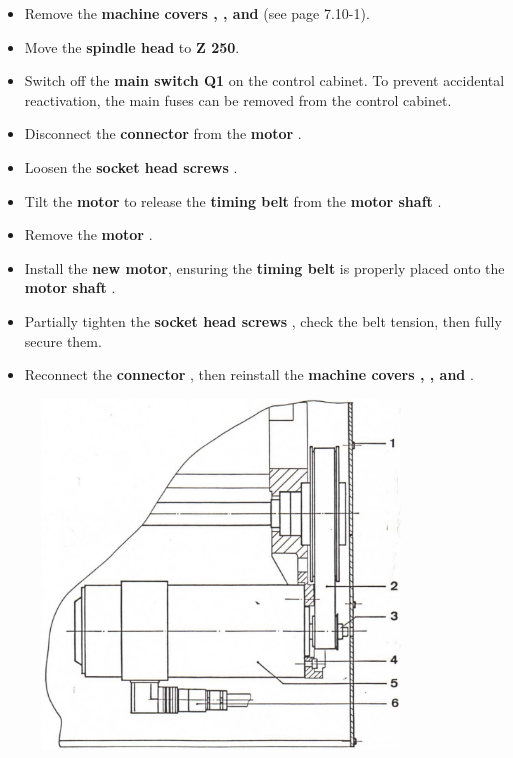 \begin{itemize}
    \setlength{\itemsep}{0pt} \setlength{\parskip}{0pt}
    \item Remove the \textbf{machine covers , , and } (see page 7.10-1).
    \item Move the \textbf{spindle head} to \textbf{Z 250}.
    \item Switch off the \textbf{main switch Q1} on the control cabinet.  
          To prevent accidental reactivation, the main fuses can be removed from the control cabinet.
    \item Disconnect the \textbf{connector } from the \textbf{motor }.
    \item Loosen the \textbf{socket head screws }.
    \item Tilt the \textbf{motor } to release the \textbf{timing belt } from the \textbf{motor shaft }.
    \item Remove the \textbf{motor }.
    \item Install the \textbf{new motor}, ensuring the \textbf{timing belt } is properly placed onto the \textbf{motor shaft }.
    \item Partially tighten the \textbf{socket head screws },  
          check the belt tension, then fully secure them.
    \item Reconnect the \textbf{connector }, then reinstall the \textbf{machine covers , , and }.
\end{itemize}

\begin{figure}[H]
    \centering
    \includegraphics[width=0.85\textwidth]{images/chapter9/feed_drive_motor_z_axis.jpg}
    \label{fig:feed_drive_motor_z_axis}
\end{figure}
